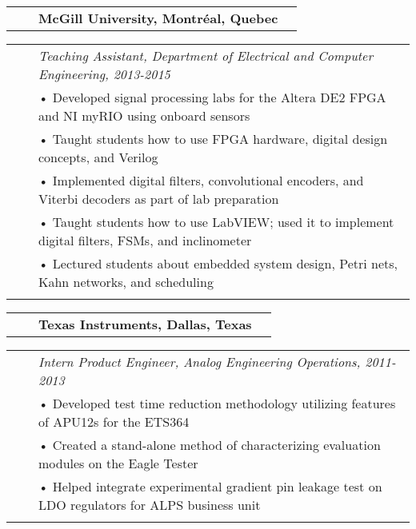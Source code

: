 \documentclass{minimal}
\begin{document}
\begin{CJK*}{UTF8}{}
\pagebreak

\begin{tabular}{ p{1.5cm} p{1cm} p{10cm} >{\raggedleft\arraybackslash}p{3cm} }
& & \textbf{McGill University, Montréal, Quebec} & \\
\end{tabular}

\begin{tabular}{ p{1.5cm} p{1cm} p{16cm} }
& & \textit{Teaching Assistant, Department of Electrical and Computer Engineering, 2013-2015}\\
& & • Developed signal processing labs for the Altera DE2 FPGA and NI myRIO using onboard sensors\\
& & • Taught students how to use FPGA hardware, digital design concepts, and Verilog\\
& & • Implemented digital filters, convolutional encoders, and Viterbi decoders as part of lab preparation\\
& & • Taught students how to use LabVIEW; used it to implement digital filters, FSMs, and inclinometer\\
& & • Lectured students about embedded system design, Petri nets, Kahn networks, and scheduling\\
& & \\
\end{tabular}

\begin{tabular}{ p{1.5cm} p{1cm} p{10cm} >{\raggedleft\arraybackslash}p{3cm} }
& & \textbf{Texas Instruments, Dallas, Texas} & \\
\end{tabular}

\begin{tabular}{ p{1.5cm} p{1cm} p{16cm} }
& & \textit{Intern Product Engineer, Analog Engineering Operations, 2011-2013}\\
& & • Developed test time reduction methodology utilizing features of APU12s for the ETS364\\
& & • Created a stand-alone method of characterizing evaluation modules on the Eagle Tester\\
& & • Helped integrate experimental gradient pin leakage test on LDO regulators for ALPS business unit\\
& & \\
\end{tabular}


\end{CJK*}
\end{document}
